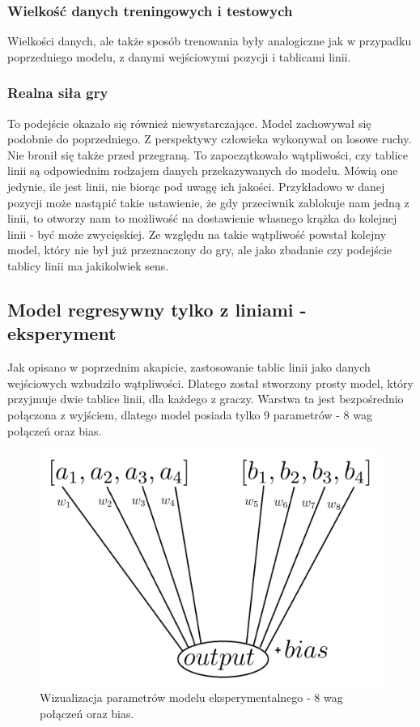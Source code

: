 \documentclass[12pt]{article}
\begin{document}
\subsubsection{Wielkość danych treningowych i testowych}

Wielkości danych, ale także sposób trenowania były analogiczne jak w przypadku poprzedniego modelu, z danymi wejściowymi pozycji i tablicami linii.

\subsubsection{Realna siła gry}
To podejście okazało się również niewystarczające. Model zachowywał się podobnie do poprzedniego. Z perspektywy człowieka wykonywał on losowe ruchy. Nie bronił się także przed przegraną. To zapoczątkowało wątpliwości, czy tablice linii są odpowiednim rodzajem danych przekazywanych do modelu. Mówią one jedynie, ile jest linii, nie biorąc pod uwagę ich jakości. Przykładowo w danej pozycji może nastąpić takie ustawienie, że gdy przeciwnik zablokuje nam jedną z linii, to otworzy nam to możliwość na dostawienie własnego krążka do kolejnej linii - być może zwycięskiej. Ze względu na takie wątpliwość powstał kolejny model, który nie był już przeznaczony do gry, ale jako zbadanie czy podejście tablicy linii ma jakikolwiek sens.

\subsection{Model regresywny tylko z liniami - eksperyment}

Jak opisano w poprzednim akapicie, zastosowanie tablic linii jako danych wejściowych wzbudziło wątpliwości. Dlatego został stworzony prosty model, który przyjmuje dwie tablice linii, dla każdego z graczy. Warstwa ta jest bezpośrednio połączona z wyjściem, dlatego model posiada tylko 9 parametrów - 8 wag połączeń oraz bias.

\begin{figure}[!ht]
    \centering
    \includegraphics[scale=0.40]{parameters.png}
    \caption{Wizualizacja parametrów modelu eksperymentalnego - 8 wag połączeń oraz bias.}
\end{figure}
\end{document}
